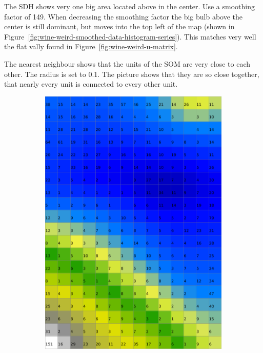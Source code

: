 \documentclass{acm_proc_article-sp}
\begin{document}
The SDH shows very one big area located above in the center. Use a smoothing factor of 149.
When decreasing the smoothing factor the big bulb above the center is still dominant,
but moves into the top left of the map (shown in Figure~\ref{fig:wine-weird-smoothed-data-histogram-series}).
This matches very well the flat vally found in
Figure~\ref{fig:wine-weird-u-matrix}.

The nearest neighbour shows that the units of the SOM are very close to each other. The 
radius is set to 0.1. The picture shows that they are so close together, that
nearly every unit is connected to every other unit.

\begin{figure}
    \centering
    \begin{subfigure}[b]{0.45\linewidth}
        \includegraphics[width=\linewidth]{img/wine-weird-activity-histogram}

\end{subfigure}
\end{figure}
\end{document}
